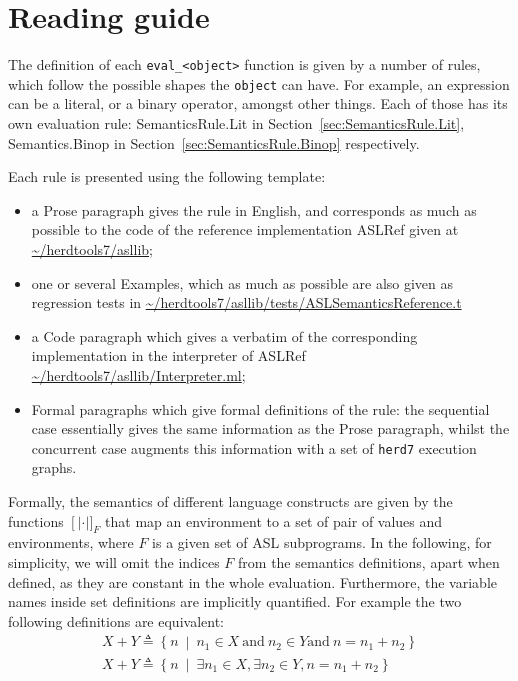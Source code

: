\documentclass{book}
\newcommand\llbracket{[|}
\newcommand\rrbracket{|]}
\newcommand\interp[1]{\left\llbracket #1 \right\rrbracket}
\newcommand\st[0]{\ \middle|\ }
\begin{document}
\section{Reading guide}

The definition of each \texttt{eval\_<object>} function is given by a number of
rules, which follow the possible shapes the \texttt{object} can have. For
example, an expression can be a literal, or a binary operator, amongst other
things. Each of those has its own evaluation rule: SemanticsRule.Lit in
Section~\ref{sec:SemanticsRule.Lit}, Semantics.Binop in
Section~\ref{sec:SemanticsRule.Binop} respectively.

Each rule is presented using the following template:
\begin{itemize}
\item a Prose paragraph gives the rule in English, and corresponds as much as possible to the code of the reference implementation ASLRef given at \url{~/herdtools7/asllib};
\item one or several Examples, which as much as possible are also given as regression tests in \url{~/herdtools7/asllib/tests/ASLSemanticsReference.t} 
\item a Code paragraph which gives a verbatim of the corresponding implementation in the interpreter of ASLRef \url{~/herdtools7/asllib/Interpreter.ml};
\item Formal paragraphs which give formal definitions of the rule: the
sequential case essentially gives the same information as the Prose paragraph,
whilst the concurrent case augments this information with a set of
\texttt{herd7} execution graphs.
\end{itemize}
%
Formally, the semantics of different language constructs are given by the functions
$\interp{\cdot}_F$ that map an environment to a set of pair of values and
environments, where $F$ is a given set of ASL subprograms.
%
In the following, for simplicity, we will omit the indices $F$ from the
semantics definitions, apart when defined, as they are constant in the whole
evaluation.
%
Furthermore, the variable names inside set definitions are implicitly
quantified. For example the two following definitions are equivalent:
%
\begin{gather*}
  X + Y \triangleq \left\{ n \st{} n_1 \in X \ \text{and}\ n_2 \in Y \text{and}\ n = n_1 + n_2 \right\}
  \\
  X + Y \triangleq \left\{ n \st{} \exists n_1 \in X, \exists n_2 \in Y, n = n_1 + n_2 \right\}
\end{gather*}
\end{document}
